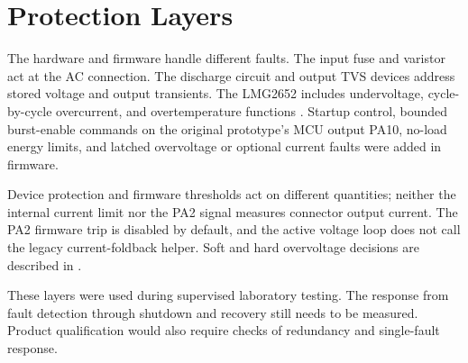 \section{Protection Layers}
\label{sec:hw-protection}

The hardware and firmware handle different faults. The input fuse and varistor act at the AC connection. The discharge circuit and output TVS devices address stored voltage and output transients. The LMG2652 includes undervoltage, cycle-by-cycle overcurrent, and overtemperature functions \cite{tiLMG2652}. Startup control, bounded burst-enable commands on the original prototype's MCU output PA10, no-load energy limits, and latched overvoltage or optional current faults were added in firmware.

Device protection and firmware thresholds act on different quantities; neither the internal current limit nor the PA2 signal measures connector output current. The PA2 firmware trip is disabled by default, and the active voltage loop does not call the legacy current-foldback helper. Soft and hard overvoltage decisions are described in .

These layers were used during supervised laboratory testing. The response from fault detection through shutdown and recovery still needs to be measured. Product qualification would also require checks of redundancy and single-fault response.
